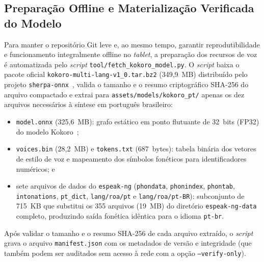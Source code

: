 \subsection{Preparação Offline e Materialização Verificada do Modelo} \label{sec:met_tts_modelo}

Para manter o repositório Git leve e, ao mesmo tempo, garantir reprodutibilidade e funcionamento integralmente offline no \textit{tablet}, a preparação dos recursos de voz é automatizada pelo \textit{script} \texttt{tool/fetch\_kokoro\_model.py}. O \textit{script} baixa o pacote oficial \texttt{kokoro-\allowbreak multi-\allowbreak lang-\allowbreak v1\_0.tar.bz2} (349,9~MB) distribuído pelo projeto \texttt{sherpa-onnx}~\cite{sherpa_onnx}, valida o tamanho e o resumo criptográfico SHA-256 do arquivo compactado e extrai para \texttt{assets/\allowbreak models/\allowbreak kokoro\_pt/} apenas os dez arquivos necessários à síntese em português brasileiro:
\begin{itemize}
    \item \texttt{model.onnx} (325,6~MB): grafo estático em ponto flutuante de 32~bits (FP32) do modelo Kokoro~\cite{kokoro82m};
    \item \texttt{voices.bin} (28,2~MB) e \texttt{tokens.txt} (687~bytes): tabela binária dos vetores de estilo de voz e mapeamento dos símbolos fonéticos para identificadores numéricos; e
    \item sete arquivos de dados do \texttt{espeak-ng} (\texttt{phondata}, \texttt{phonindex}, \texttt{phontab}, \texttt{intonations\allowbreak}, \texttt{pt\_dict}, \texttt{lang/roa/pt} e \texttt{lang/roa/pt-BR}): subconjunto de 715~KB que substitui os 355 arquivos (19~MB) do diretório \texttt{espeak-ng-data} completo, produzindo saída fonética idêntica para o idioma \texttt{pt-br}.
\end{itemize}
Após validar o tamanho e o resumo SHA-256 de cada arquivo extraído, o \textit{script} grava o arquivo \texttt{manifest.json} com os metadados de versão e integridade (que também podem ser auditados sem acesso à rede com a opção \texttt{--verify-only}).

